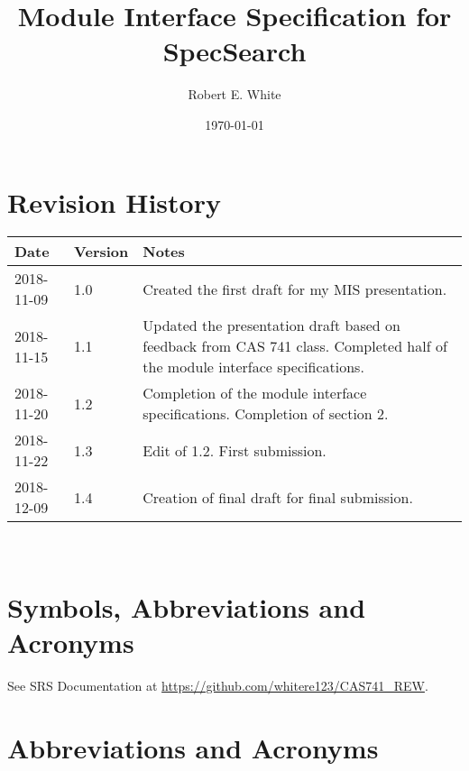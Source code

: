 \documentclass[12pt, titlepage]{article}
\newcommand{\progname}{SpecSearch}
\begin{document}
\title{Module Interface Specification for \progname}

\author{Robert E. White}

\date{\today}

\maketitle


\section{Revision History}

\begin{tabularx}{\textwidth}{p{3cm}p{2cm}X}
\toprule {\bf Date} & {\bf Version} & {\bf Notes}\\
\midrule
2018-11-09 & 1.0 & Created the first draft for my MIS presentation. \\ 
2018-11-15 & 1.1 & Updated the presentation draft based on feedback from CAS 
741 class. 
Completed half of the module interface specifications. \\ 
2018-11-20 & 1.2 & Completion of the module interface specifications. 
Completion of section 2. \\
2018-11-22 & 1.3 & Edit of 1.2. First submission. \\ 
2018-12-09 & 1.4 & Creation of final draft for final submission. \\ 
\bottomrule
\end{tabularx}

~\newpage

\section{Symbols, Abbreviations and Acronyms} \label{abbrev}

See SRS Documentation at \url{https://github.com/whitere123/CAS741_REW}. 

\section*{Abbreviations and Acronyms}
\end{document}

